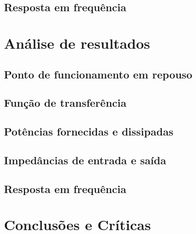 \documentclass[%
  reprint,
  nofootinbib,
  amsmath,amssymb,
  aps,
  10pt,
  a4paper
]{revtex4-1}
\begin{document}
\subsection{Resposta em frequência}






\section{Análise de resultados}
\label{s:aresul}
\subsection{Ponto de funcionamento em repouso}
\subsection{Função de transferência}
\subsection{Potências fornecidas e dissipadas}
\subsection{Impedâncias de entrada e saída}
\subsection{Resposta em frequência}


\section{Conclusões e Críticas}
\label{s:conclu}




\nocite{*}
{}
\end{document}
